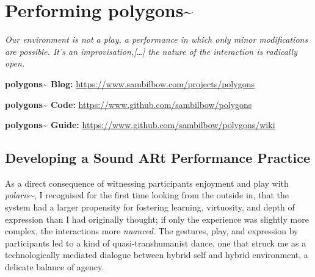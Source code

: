\chapter{Performing polygons\textasciitilde{}}
\label{sec: polygons}
\epigraph{\emph{Our environment is not a play, a performance in which only minor modifications are possible. It's an improvisation,[…] the nature of the interaction is radically open.}}{\citep{vermeulen2015}}

\noindent \textbf{polygons\textasciitilde{} Blog:}        \url{https://www.sambilbow.com/projects/polygons}

\noindent \textbf{polygons\textasciitilde{} Code:}        \url{https://www.github.com/sambilbow/polygons}

\noindent \textbf{polygons\textasciitilde{} Guide:}       \url{https://www.github.com/sambilbow/polygons/wiki}

\clearpage
\section{Developing a Sound ARt Performance Practice} \label{sec: polygons-developing}
As a direct consequence of witnessing participants enjoyment and play with \textit{polaris\textasciitilde{}}, I recognised for the first time looking from the outside in, that the system had a larger propensity for fostering learning, virtuosity, and depth of expression than I had originally thought; if only the experience was slightly more complex, the interactions more \textit{nuanced}. The gestures, play, and expression by participants led to a kind of quasi-transhumanist dance, one that struck me as a technologically mediated dialogue between hybrid self and hybrid environment, a delicate balance of agency.

